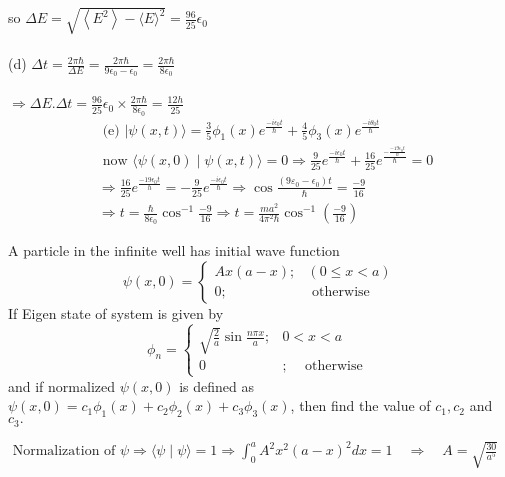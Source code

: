 \begin{enumerate}
\begin{answer}
	so $\Delta E=\sqrt{\left\langle E^{2}\right\rangle-\langle E\rangle^{2}}=\frac{96}{25} \epsilon_{0}$\\\\
	(d) $\Delta t=\frac{2 \pi \hbar}{\Delta E}=\frac{2 \pi \hbar}{9 \epsilon_{0}-\epsilon_{0}}=\frac{2 \pi \hbar}{8 \epsilon_{0}}$\\\\
	$\Rightarrow \Delta E . \Delta t=\frac{96}{25} \epsilon_{0} \times \frac{2 \pi \hbar}{8 \epsilon_{0}}=\frac{12 h}{25}$
	\begin{align*}
		&\text { (e) }|\psi(x, t)\rangle=\frac{3}{5} \phi_{1}(x) e^{\frac{-i \epsilon_{0} t}{\hbar}}+\frac{4}{5} \phi_{3}(x) e^{\frac{-i \theta_{0} t}{\hbar}} \\
		&\text { now }\langle\psi(x, 0) \mid \psi(x, t)\rangle=0 \Rightarrow \frac{9}{25} e^{\frac{-i \epsilon_{0} t}{\hbar}}+\frac{16}{25} e^{\frac{-\frac{-19 \epsilon_{0} t}{\hbar}}{\hbar}}=0 \\
		&\Rightarrow \frac{16}{25} e^{\frac{-19 \epsilon_{0} t}{h}}=-\frac{9}{25} e^{\frac{-i \epsilon_{0} t}{\hbar}} \Rightarrow \cos \frac{\left(9 \varepsilon_{0}-\epsilon_{0}\right) t}{\hbar}=\frac{-9}{16} \\
		&\Rightarrow t=\frac{\hbar}{8 \epsilon_{0}} \cos ^{-1} \frac{-9}{16} \Rightarrow t=\frac{m a^{2}}{4 \pi^{2} \hbar} \cos ^{-1}\left(\frac{-9}{16}\right)
	\end{align*}
\end{answer}
	\begin{minipage}{\textwidth}
	\item A particle in the infinite well has initial wave function
	$$
	\psi(x, 0)= \begin{cases}A x(a-x) ; & (0 \leq x<a) \\ 0 ; & \text { otherwise }\end{cases}
	$$
	If Eigen state of system is given by
	$$
	\phi_{n}= \begin{cases}\sqrt{\frac{2}{a}} \sin \frac{n \pi x}{a} ; & 0<x<a \\ 0 & ; \quad \text { otherwise }\end{cases}
	$$
	and if normalized $\psi(x, 0)$ is defined as $\psi(x, 0)=c_{1} \phi_{1}(x)+c_{2} \phi_{2}(x)+c_{3} \phi_{3}(x)$, then find the value of $c_{1}, c_{2}$ and $c_{3} .$
\end{minipage}
\begin{answer}
	$\text { Normalization of } \psi \Rightarrow\langle\psi \mid \psi\rangle=1 \Rightarrow \int_{0}^{a} A^{2} x^{2}(a-x)^{2} d x=1 \quad \Rightarrow \quad A=\sqrt{\frac{30}{a^{5}}}$\\

\end{answer}
\end{enumerate}
